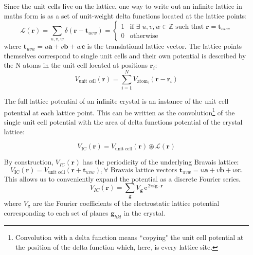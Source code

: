 Since the unit cells live on the lattice, one way to write out an infinite lattice in maths form is as a set of unit-weight delta functions located at the lattice points:
\begin{equation}
\mathcal{L}(\mathbf{r}) = \sum_{u,v,w} \delta(\mathbf{r}-\mathbf{t}_{uvw})= \begin{cases} 1 & \mbox{if }	\exists \, \, u, v, w \in  \mathbb{Z} \mbox{ such that  }  \mathbf{r}=\mathbf{t}_{uvw} \\
																						  0 & \mbox{otherwise }
																							\end{cases}
\end{equation}
where $\mathbf{t}_{uvw} =  u\mathbf{a} + v\mathbf{b} + w\mathbf{c}$ is the translational lattice vector. The lattice points themselves correspond to single unit cells and their own potential is described by the N atoms in the unit cell located at positions $\mathbf{r}_i$:
\begin{equation}
V_{\text{unit cell}}(\mathbf{r}) = \sum_{i=1}^{N} V_{\text{atom}_i}(\mathbf{r}- \mathbf{r}_i)
\end{equation}

The full lattice potential of an infinite crystal is an instance of the unit cell potential at each lattice point. This can be written as the convolution\footnote{ Convolution with a delta function means ``copying" the unit cell potential at the position of the delta function which, here, is every lattice site.} of the single unit cell potential with the area of delta functions potential of the crystal lattice:

\begin{equation}
V_{\text{IC}}(\mathbf{r} ) = V_{\text{unit cell}}(\mathbf{r})  \circledast  \mathcal{L}(\mathbf{r})
\end{equation}

By construction, $V_{IC}(\mathbf{r})$ has the periodicity of the underlying Bravais lattice:
\begin{equation}
V_{\text{IC}}(\mathbf{r} ) = V_{\text{unit cell}}(\mathbf{r} + \mathbf{t}_{uvw} ),  \forall \text{ Bravais lattice vectors } \mathbf{t}_{uvw} = u\mathbf{a} + v\mathbf{b} + w\mathbf{c}.
\end{equation}
This allows us to conveniently expand the potential as a discrete Fourier series.
\begin{equation}
V_{IC}(\mathbf{r} ) = \sum_{\mathbf{g}} V_{\mathbf{g}} \, \mathrm{e}^{\, 2\pi i \mathbf{g}\cdot \mathbf{r}}
\end{equation}
where $V_{\mathbf{g}}$ are the Fourier coefficients of the electrostatic lattice potential corresponding to each set of planes $\mathbf{g}_{hkl}$ in the crystal. 

